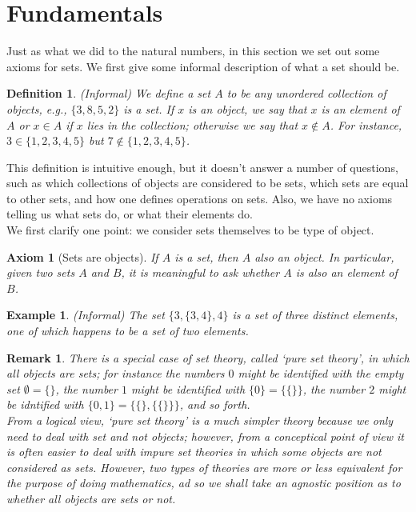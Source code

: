 \documentclass[a4paper,oneside]{book}
\newtheorem{definition}{Definition}[section]
\newtheorem{axiom}{Axiom}[chapter]
\newtheorem{example}{Example}[section]
\newtheorem{remark}{Remark}[section]
\begin{document}
		\section{Fundamentals}
			Just as what we did to the natural numbers, in this section we set out some axioms for sets. We first give some informal description of what a set should be.
			\begin{definition}
				(Informal) We define a set $A$ to be any unordered collection of objects, e.g., $\{3,8,5,2\}$ is a set. If $x$ is an object, we say that $x$ is an element of $A$ or $x\in A$ if $x$ lies in the collection; otherwise we say that $x\notin A$. For instance, $3\in \{1,2,3,4,5\}$ but $7\notin \{1,2,3,4,5\}$.
			\end{definition}
			This definition is intuitive enough, but it doesn't answer a number of questions, such as which collections of objects are considered to be sets, which sets are equal to other sets, and how one defines operations on sets. Also, we have no axioms telling us what sets do, or what their elements do.\\
			We first clarify one point: we consider sets themselves to be type of object.
			\begin{axiom}[Sets are objects]
				If $A$ is a set, then $A$ also an object. In particular, given two sets $A$ and $B$, it is meaningful to ask whether $A$ is also an element of $B$.
			\end{axiom}
			\begin{example}
				(Informal) The set $\{3,\{3,4\},4\}$ is a set of three distinct elements, one of which happens to be a set of two elements.
			\end{example}
			\begin{remark}
				There is a special case of set theory, called `pure set theory', in which \textit{all} objects are sets; for instance the numbers $0$ might be identified with the empty set $\emptyset=\{\}$, the number $1$ might be identified with $\{0\}=\{\{\}\}$, the number $2$ might be idntified with $\{0,1\}=\{\{\},\{\{\}\}\}$, and so forth.\\
				From a logical view, `pure set theory' is a much simpler theory because we only need to deal with set and not objects; however, from a conceptical point of view it is often easier to deal with impure set theories in which some objects are not considered as sets. However, two types of theories are more or less equivalent for the purpose of doing mathematics, ad so we shall take an agnostic position as to whether all objects are sets or not.
			\end{remark}
\end{document}
